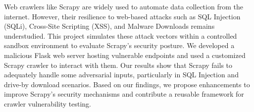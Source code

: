 Web crawlers like Scrapy are widely used to automate data collection from the internet. However, their resilience to web-based attacks such as SQL Injection (SQLi), Cross-Site Scripting (XSS), and Malware Downloads remains understudied. This project simulates these attack vectors within a controlled sandbox environment to evaluate Scrapy's security posture. We developed a malicious Flask web server hosting vulnerable endpoints and used a customized Scrapy crawler to interact with them. Our results show that Scrapy fails to adequately handle some adversarial inputs, particularly in SQL Injection and drive-by download scenarios. Based on our findings, we propose enhancements to improve Scrapy’s security mechanisms and contribute a reusable framework for crawler vulnerability testing.